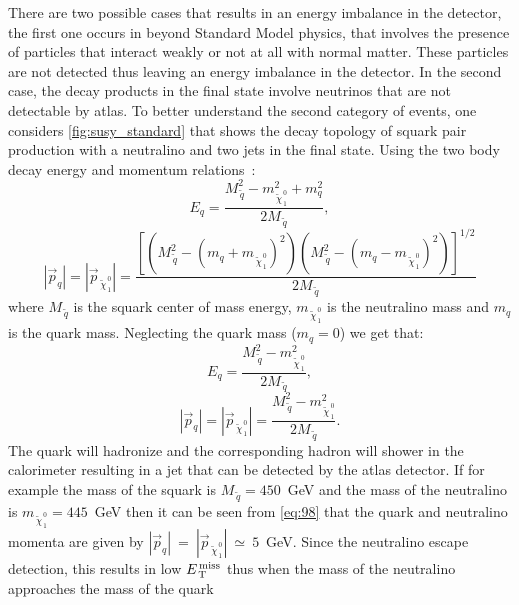 There are two possible cases that results in an energy imbalance in the
detector, the first one occurs in beyond Standard Model physics, that involves
the presence of particles that interact weakly or not at all with normal
matter. These particles are not detected thus leaving an energy imbalance in the
detector. In the second case, the decay products in the final state involve
neutrinos that are not detectable by \gls{atlas}\@. To better understand the
second category of events, one considers \cref{fig:susy_standard} that shows the
decay topology of squark pair production with a neutralino and two jets in the
final state. Using the two body decay energy and momentum relations~\cite{PDG}:
\begin{equation}
  \label{eq:95}
  E_q = \frac{M_{\, \tilde{q}}^2 - m_{\, \tilde{\chi}_{\, 1}^{\, 0}}^2 + m_q^2}{2
    M_{\, \tilde{q}}},
\end{equation}
\begin{equation}
  \label{eq:96}
  |\vec{p}_q| = |\vec{p}_{\, \tilde{\chi}_{\, 1}^{\, 0}}| = \frac{\left[ \left(
        M_{\, \tilde{q}}^2 - (m_q + m_{\, \tilde{\chi}_{\, 1}^{\, 0}})^2
      \right) \left( M_{\, \tilde{q}}^2 - (m_q - m_{\, \tilde{\chi}_{\, 1}^{\,
            0}})^2 \right) \right]^{1/2}}{2 M_{\, \tilde{q}}}
\end{equation}
where $M_{\, \tilde{q}}$ is the squark center of mass energy,
$m_{\, \tilde{\chi}_{\, 1}^{\, 0}}$ is the neutralino mass and $m_q$ is the
quark mass. Neglecting the quark mass ($m_q = 0$) we get that:
\begin{equation}
  \label{eq:97}
  E_q = \frac{M_{\, \tilde{q}}^2 - m_{\, \tilde{\chi}_{\, 1}^{\, 0}}^2}{2 M_{\,
      \tilde{q}}},
\end{equation}
\begin{equation}
  \label{eq:98}
  |\vec{p}_q| = |\vec{p}_{\, \tilde{\chi}_{\, 1}^{\, 0}}| = \frac{M_{\,
      \tilde{q}}^2 - m_{\, \tilde{\chi}_{\, 1}^{\, 0}}^2}{2 M_{\, \tilde{q}}}.
\end{equation}
The quark will hadronize and the corresponding hadron will shower in the
calorimeter resulting in a jet that can be detected by the \gls{atlas}
detector. If for example the mass of the squark is $M_{\, \tilde{q}} = 450$~GeV
and the mass of the neutralino is $m_{\, \tilde{\chi}_{\, 1}^{\, 0}} = 445$~GeV
then it can be seen from \cref{eq:98} that the quark and neutralino momenta are
given by $|\vec{p}_q|~=~|\vec{p}_{\, \tilde{\chi}_{\, 1}^{\,
    0}}|~\simeq~5$~GeV. Since the neutralino escape detection, this results in
low $E_\mathrm{\, T}^\mathrm{\, miss}$ thus when the mass of the neutralino approaches the mass of the quark
